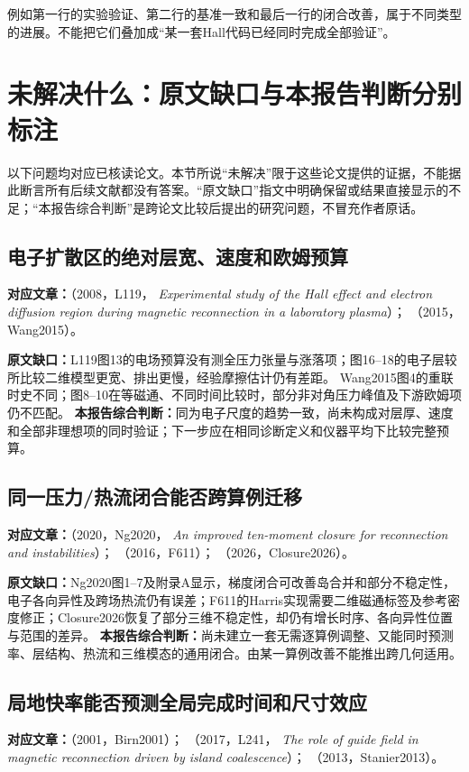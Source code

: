 例如第一行的实验验证、第二行的基准一致和最后一行的闭合改善，属于不同类型的进展。不能把它们叠加成“某一套Hall代码已经同时完成全部验证”。

\section{未解决什么：原文缺口与本报告判断分别标注}
\label{sec:guide-unsolved}
以下问题均对应已核读论文。本节所说“未解决”限于这些论文提供的证据，不能据此断言所有后续文献都没有答案。“原文缺口”指文中明确保留或结果直接显示的不足；“本报告综合判断”是跨论文比较后提出的研究问题，不冒充作者原话。

\subsection{电子扩散区的绝对层宽、速度和欧姆预算}
\textbf{对应文章：}\citet{L119}（2008，L119，
\emph{Experimental study of the Hall effect and electron diffusion region during magnetic reconnection in a laboratory plasma}）；
\citet{Wang2015}（2015，Wang2015）。

\textbf{原文缺口：}L119图13的电场预算没有测全压力张量与涨落项；图16--18的电子层较所比较二维模型更宽、排出更慢，经验摩擦估计仍有差距。
Wang2015图4的重联时史不同；图8--10在等磁通、不同时间比较时，部分非对角压力峰值及下游欧姆项仍不匹配。
\textbf{本报告综合判断：}同为电子尺度的趋势一致，尚未构成对层厚、速度和全部非理想项的同时验证；下一步应在相同诊断定义和仪器平均下比较完整预算。

\subsection{同一压力/热流闭合能否跨算例迁移}
\textbf{对应文章：}\citet{Ng2020}（2020，Ng2020，
\emph{An improved ten-moment closure for reconnection and instabilities}）；
\citet{F611}（2016，F611）；
\citet{Closure2026}（2026，Closure2026）。

\textbf{原文缺口：}Ng2020图1--7及附录A显示，梯度闭合可改善岛合并和部分不稳定性，电子各向异性及跨场热流仍有误差；F611的Harris实现需要二维磁通标签及参考密度修正；Closure2026恢复了部分三维不稳定性，却仍有增长时序、各向异性位置与范围的差异。
\textbf{本报告综合判断：}尚未建立一套无需逐算例调整、又能同时预测率、层结构、热流和三维模态的通用闭合。由某一算例改善不能推出跨几何适用。

\subsection{局地快率能否预测全局完成时间和尺寸效应}
\textbf{对应文章：}\citet{Birn2001}（2001，Birn2001）；
\citet{L241}（2017，L241，
\emph{The role of guide field in magnetic reconnection driven by island coalescence}）；
\citet{Stanier2013}（2013，Stanier2013）。

